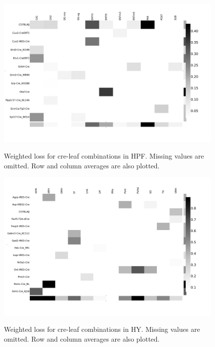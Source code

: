 
\begin{figure}[H]
    \centering
    \includegraphics[width = 7in]{figs/lossdetails_1089.png} 
    \label{fig:distances}
    \caption{Weighted loss for cre-leaf combinations in HPF. Missing values are omitted.   Row and column averages are also plotted.}
\end{figure}

\begin{figure}[H]
    \centering
    \includegraphics[width = 7in]{figs/lossdetails_1097.png} 
    \label{fig:distances}
    \caption{Weighted loss for cre-leaf combinations in HY. Missing values are omitted.   Row and column averages are also plotted.}
\end{figure}

